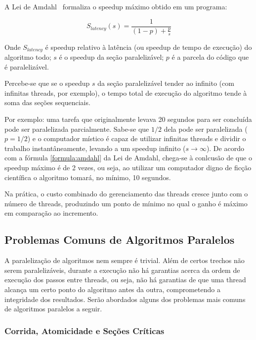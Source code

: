 \documentclass[12pt,a4paper]{article}
\begin{document}
A Lei de Amdahl~\cite{bryant2003computer} formaliza o speedup máximo obtido em um programa:

\begin{equation}
\label{formula:amdahl}
    S_{latency} \left ( s \right ) = \frac{1}{\left ( 1 - p\right )+ \frac{p}{s}}
\end{equation}

Onde $S_{latency}$ é speedup relativo à latência (ou speedup de tempo de execução) do algoritmo todo; $s$ é o speedup da seção paralelizável; $p$ é a parcela do código que é paralelizável.

Percebe-se que se o speedup $s$ da seção paralelizável tender ao infinito (com infinitas threads, por exemplo), o tempo total de execução do algoritmo tende à soma das seções sequenciais.

Por exemplo: uma tarefa que originalmente levava 20 segundos para ser concluída pode ser paralelizada parcialmente. Sabe-se que $1/2$ dela pode ser paralelizada ($p=1/2$) e o computador místico é capaz de utilizar infinitas threads e dividir o trabalho instantâneamente, levando a um speedup infinito ($s \to \infty$). De acordo com a fórmula \ref{formula:amdahl} da Lei de Amdahl, chega-se à conlcusão de que o speedup máximo é de 2 vezes, ou seja, ao utilizar um computador digno de ficção científica o algoritmo tomará, no mínimo, 10 segundos.

Na prática, o custo combinado do gerenciamento das threads cresce junto com o número de threads, produzindo um ponto de mínimo no qual o ganho é máximo em comparação ao incremento.

\subsection{Problemas Comuns de Algoritmos Paralelos}
\label{ssec:problemas comuns}

A paralelização de algoritmos nem sempre é trivial. Além de certos trechos não serem paralelizáveis, durante a execução não há garantias acerca da ordem de execução dos passos entre threads, ou seja, não há garantias de que uma thread alcança um certo ponto do algoritmo antes da outra, comprometendo a integridade dos resultados. Serão abordados alguns dos problemas mais comuns de algoritmos paralelos a seguir.

\subsubsection{Corrida, Atomicidade e Seções Críticas}
\label{sssec:corrida atomicidade e secoes criticas}
\end{document}
